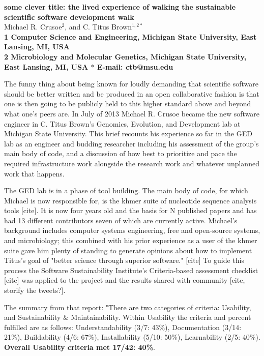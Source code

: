 \documentclass{article}
\begin{document}
\begin{flushleft}
{\Large \textbf{some clever title: the lived experience of walking the
sustainable scientific software development walk}}
\\
Michael R. Crusoe$^{2}$, and
C. Titus Brown$^{1,2\ast}$
\\
\bf{1} Computer Science and Engineering, Michigan State University, East Lansing, MI, USA
\\
\bf{2} Microbiology and Molecular Genetics, Michigan State University, East Lansing, MI, USA
$\ast$ E-mail: ctb@msu.edu
\end{flushleft}


The funny thing about being known for loudly demanding that scientific software
should be better written and be produced in an open collaborative fashion is
that one is then going to be publicly held to this higher standard above and
beyond what one's peers are. In July of 2013 Michael R. Crusoe became the new
software engineer in C. Titus Brown's Genomics, Evolution, and Development lab
at Michigan State University. This brief recounts his experience so far in the
GED lab as an engineer and budding researcher including his assessment of the group's
main body of code, and a discussion of how best to prioritize and pace the
required infrastructure work alongside the research work and whatever unplanned
work that happens. 

The GED lab is in a phase of tool building. The main body of code, for
which Michael is now responsible for, is the khmer suite of nucleotide sequence
analysis tools [cite]. It is now four years old and the basis for N
published papers and has had 13 different contributors seven of which are
currently active.  Michael's background includes computer systems engineering,
free and open-source systems, and microbiology; this combined with his prior
experience as a user of the khmer suite gave him plenty of standing to generate
opinions about how to implement Titus's goal of "better science through superior
software." [cite] To guide this process the Software Sustainability Institute's
Criteria-based assessment checklist [cite] was applied to the project and the
results shared with community [cite, storify the tweets?].

The summary from that report: "There are two categories of criteria: Usability, and
Sustainability \& Maintainability. Within Usability the criteria and percent
fulfilled are as follows: Understandability (3/7: 43\%), Documentation (3/14:
21\%), Buildability (4/6: 67\%), Installability (5/10: 50\%), Learnability (2/5:
40\%). \textbf{Overall Usability criteria met 17/42: 40\%}.
\end{document}
